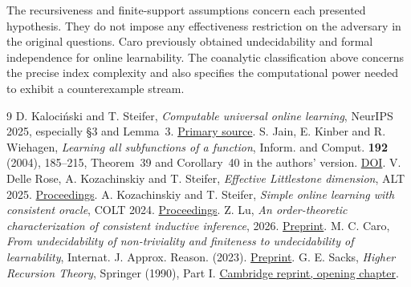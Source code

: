 \documentclass[11pt]{article}
\begin{document}
The recursiveness and finite-support assumptions concern each presented hypothesis. They do not impose any effectiveness restriction on the adversary in the original questions. Caro \cite{caro} previously obtained undecidability and formal independence for online learnability. The coanalytic classification above concerns the precise index complexity and also specifies the computational power needed to exhibit a counterexample stream.

\begin{thebibliography}{9}
 D. Kaloci\'nski and T. Steifer, \emph{Computable universal online learning}, NeurIPS 2025, especially \S3 and Lemma~3. \href{https://arxiv.org/abs/2510.18352}{Primary source}.
 S. Jain, E. Kinber and R. Wiehagen, \emph{Learning all subfunctions of a function}, Inform. and Comput. \textbf{192} (2004), 185--215, Theorem~39 and Corollary~40 in the authors' version. \href{https://doi.org/10.1016/j.ic.2004.03.003}{DOI}.
 V. Delle Rose, A. Kozachinskiy and T. Steifer, \emph{Effective Littlestone dimension}, ALT 2025. \href{https://proceedings.mlr.press/v272/delle-rose25a.html}{Proceedings}.
 A. Kozachinskiy and T. Steifer, \emph{Simple online learning with consistent oracle}, COLT 2024. \href{https://proceedings.mlr.press/v247/kozachinskiy24a.html}{Proceedings}.
 Z. Lu, \emph{An order-theoretic characterization of consistent inductive inference}, 2026. \href{https://arxiv.org/abs/2609.28551}{Preprint}.
 M. C. Caro, \emph{From undecidability of non-triviality and finiteness to undecidability of learnability}, Internat. J. Approx. Reason. (2023). \href{https://arxiv.org/abs/2106.01382}{Preprint}.
 G. E. Sacks, \emph{Higher Recursion Theory}, Springer (1990), Part I. \href{https://assets.cambridge.org/97811071/68435/excerpt/9781107168435_excerpt.pdf}{Cambridge reprint, opening chapter}.
\end{thebibliography}
\end{document}
